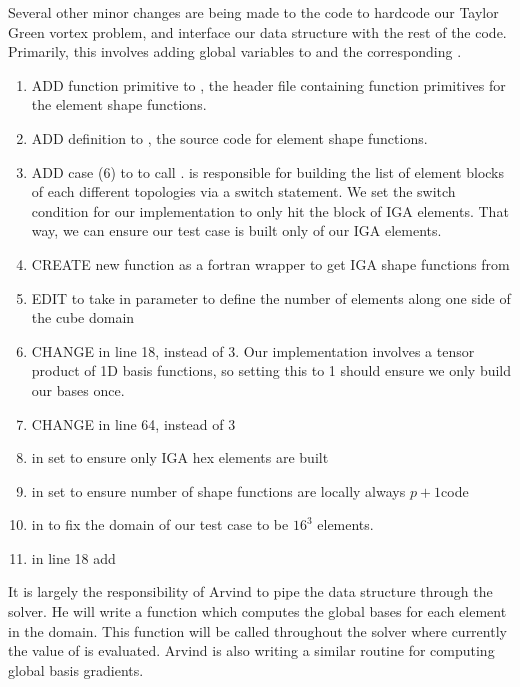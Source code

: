 \documentclass[./]{subfiles}
\begin{document}
Several other minor changes are being made to the code to hardcode our Taylor Green vortex problem, and interface our data structure with the rest of the code. Primarily, this involves adding global variables to  and the corresponding .

\begin{enumerate}
\item ADD  function primitive to , the header file containing function primitives for the element shape functions.
\item  ADD  definition to , the source code for element shape functions.
\item  ADD  case (6) to  to call .  is responsible for building the list of element blocks of each different topologies via a switch statement. We set the switch condition for our implementation to only hit the block of IGA elements. That way, we can ensure our test case is built only of our IGA elements.
\item  CREATE new function  as a fortran wrapper to get IGA shape functions from 
\item  EDIT  to take in parameter  to define the number of elements along one side of the cube domain
\item CHANGE in  line 18,  instead of 3. Our implementation involves a tensor product of 1D basis functions, so setting this to 1 should ensure we only build our bases once. 
\item  CHANGE in  line 64,  instead of 3
\item  in  set  to ensure only IGA hex elements are built
\item  in  set  to ensure number of shape functions are locally always $p+1$code
\item  in   to fix the domain of our test case to be $16^3$ elements.
\item  in  line 18 add  
\end{enumerate}

It is largely the responsibility of Arvind to pipe the  data structure through the solver. He will write a function  which computes the global bases for each element in the domain. This function will be called throughout the solver where currently the value of  is evaluated. Arvind is also writing a similar routine for computing global basis gradients. 
\end{document}
